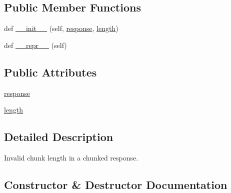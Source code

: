 \subsection*{Public Member Functions}
\begin{DoxyCompactItemize}
\item 
def \hyperlink{classpip_1_1__vendor_1_1urllib3_1_1exceptions_1_1InvalidChunkLength_a4ef1466af3a492c3740c2b6ca885e23d}{\+\_\+\+\_\+init\+\_\+\+\_\+} (self, \hyperlink{classpip_1_1__vendor_1_1urllib3_1_1exceptions_1_1InvalidChunkLength_ad3fc83fe1ed8fd22d780848422a298a9}{response}, \hyperlink{classpip_1_1__vendor_1_1urllib3_1_1exceptions_1_1InvalidChunkLength_a9269bb97d5115e1f6abb3e51361dcb6d}{length})
\item 
def \hyperlink{classpip_1_1__vendor_1_1urllib3_1_1exceptions_1_1InvalidChunkLength_a7b573281bf9026daf007156b0986a0b9}{\+\_\+\+\_\+repr\+\_\+\+\_\+} (self)
\end{DoxyCompactItemize}
\subsection*{Public Attributes}
\begin{DoxyCompactItemize}
\item 
\hyperlink{classpip_1_1__vendor_1_1urllib3_1_1exceptions_1_1InvalidChunkLength_ad3fc83fe1ed8fd22d780848422a298a9}{response}
\item 
\hyperlink{classpip_1_1__vendor_1_1urllib3_1_1exceptions_1_1InvalidChunkLength_a9269bb97d5115e1f6abb3e51361dcb6d}{length}
\end{DoxyCompactItemize}


\subsection{Detailed Description}
\begin{DoxyVerb}Invalid chunk length in a chunked response.\end{DoxyVerb}
 

\subsection{Constructor \& Destructor Documentation}
\mbox{\label{classpip_1_1__vendor_1_1urllib3_1_1exceptions_1_1InvalidChunkLength_a4ef1466af3a492c3740c2b6ca885e23d}} 

